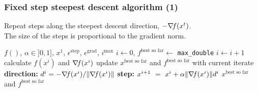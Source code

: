 \documentclass[12pt]{beamer}
\begin{document}
\begin{frame}
\frametitle{Fixed step steepest descent algorithm (1)} 
Repeat steps along the steepest descent direction, $-\nabla\!{f}(x^t)$. \\
The size of the steps is proportional to the gradient norm.
\begin{block}{}
\begin{algorithmic}
\REQUIRE $f()$, $\alpha \in ]0,1]$, $x^1$, $\epsilon^{\text{step}}$, $\epsilon^{\text{grad}}$, $i^{\text{max}}$
\STATE $i\leftarrow 0$, $f^{\text{best so far}} \leftarrow $ \texttt{max\_double}
\REPEAT 
\STATE $i \leftarrow i+1$
\STATE calculate $f(x^i)$ and $\nabla\!{f}(x^i)$
\STATE update $x^{\text{best so far}}$ and $f^{\text{best so far}}$ with current iterate
\ENDIF
\STATE \textbf{direction: } $d^i = - \nabla\!{f}(x^i) / \lVert \nabla\!{f}(x^i) \rVert$
\STATE \textbf{step: } $x^{i+1} ~=~ x^i + \alpha \lVert \nabla\!{f}(x^i) \rVert d^i$
\RETURN $x^{\text{best so far}}$ and $f^{\text{best so far}}$
\end{algorithmic}
\end{block}
\end{frame}
\end{document}
